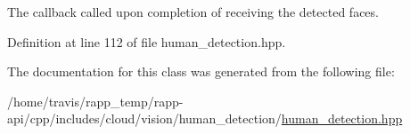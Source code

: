 The callback called upon completion of receiving the detected faces. 



Definition at line 112 of file human\-\_\-detection.\-hpp.



The documentation for this class was generated from the following file\-:\begin{DoxyCompactItemize}
\item 
/home/travis/rapp\-\_\-temp/rapp-\/api/cpp/includes/cloud/vision/human\-\_\-detection/\hyperlink{human__detection_8hpp}{human\-\_\-detection.\-hpp}\end{DoxyCompactItemize}

